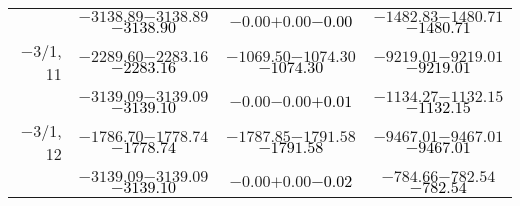 \documentclass[compress]{beamer}
\begin{document}
\begin{frame}
{\begin{tabular}{r | c | c | c}
           & $-3138.89$\hspace{0.1 cm}$-3138.89$\hspace{0.1 cm}\textcolor{black}{$-3138.90$} & $-0.00$\hspace{0.1 cm}$+0.00$\hspace{0.1 cm}\textcolor{black}{$-0.00$} & $-1482.83$\hspace{0.1 cm}$-1480.71$\hspace{0.1 cm}\textcolor{black}{$-1480.71$} \\
$-$3/1, 11 & $-2289.60$\hspace{0.1 cm}$-2283.16$\hspace{0.1 cm}\textcolor{black}{$-2283.16$} & $-1069.50$\hspace{0.1 cm}$-1074.30$\hspace{0.1 cm}\textcolor{black}{$-1074.30$} & $-9219.01$\hspace{0.1 cm}$-9219.01$\hspace{0.1 cm}\textcolor{black}{$-9219.01$} \\
           & $-3139.09$\hspace{0.1 cm}$-3139.09$\hspace{0.1 cm}\textcolor{black}{$-3139.10$} & $-0.00$\hspace{0.1 cm}$-0.00$\hspace{0.1 cm}\textcolor{black}{$+0.01$} & $-1134.27$\hspace{0.1 cm}$-1132.15$\hspace{0.1 cm}\textcolor{black}{$-1132.15$} \\
$-$3/1, 12 & $-1786.70$\hspace{0.1 cm}$-1778.74$\hspace{0.1 cm}\textcolor{black}{$-1778.74$} & $-1787.85$\hspace{0.1 cm}$-1791.58$\hspace{0.1 cm}\textcolor{black}{$-1791.58$} & $-9467.01$\hspace{0.1 cm}$-9467.01$\hspace{0.1 cm}\textcolor{black}{$-9467.01$} \\
           & $-3139.09$\hspace{0.1 cm}$-3139.09$\hspace{0.1 cm}\textcolor{black}{$-3139.10$} & $-0.00$\hspace{0.1 cm}$+0.00$\hspace{0.1 cm}\textcolor{black}{$-0.02$} & $-784.66$\hspace{0.1 cm}$-782.54$\hspace{0.1 cm}\textcolor{black}{$-782.54$} \\
\end{tabular}}
\end{frame}
\end{document}
